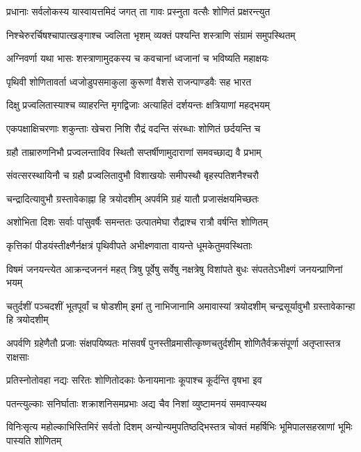 \twolineshloka
{प्रधानाः सर्वलोकस्य यास्वायत्तमिदं जगत्}
{ता गावः प्रस्नुता वत्सैः शोणितं प्रक्षरन्त्युत}


\twolineshloka
{निश्चेरुरर्चिषश्चापात्खङ्गाश्च ज्वलिता भृशम्}
{व्यक्तं पश्यन्ति शस्त्राणि संग्रामं समुपस्थितम्}


\twolineshloka
{अग्निवर्णा यथा भासः शस्त्राणामुदकस्य च}
{कवचानां ध्वजानां च भविष्यति महाक्षयः}


\twolineshloka
{पृथिवी शोणितावर्ता ध्वजोडुपसमाकुला}
{कुरूणां वैशसे राजन्पाण्डवैः सह भारत}


\twolineshloka
{दिक्षु प्रज्वलितास्याश्च व्याहरन्ति मृगद्विजाः}
{अत्याहितं दर्शयन्तः क्षत्रियाणां महद्भयम्}


\twolineshloka
{एकपक्षाक्षिचरणाः शकुन्ताः खेचरा निशि}
{रौद्रं वदन्ति संरब्धाः शोणितं छर्दयन्ति च}


\twolineshloka
{ग्रहौ ताम्रारुणनिभौ प्रज्वलन्ताविव स्थितौ}
{सप्तर्षीणामुदाराणां समवच्छाद्य वै प्रभाम्}


\twolineshloka
{संवत्सरस्थायिनौ च ग्रहौ प्रज्वलितावुभौ}
{विशाखयोः समीपस्थौ बृहस्पतिशनैश्चरौ}


\twolineshloka
{चन्द्रादित्यावुभौ ग्रस्तावेकाह्ना हि त्रयोदशीम्}
{अपर्वमि ग्रहं यातौ प्रजासंक्षयमिच्छतः}


\twolineshloka
{अशोभिता दिशः सर्वाः पांसुवर्षैः समन्ततः}
{उत्पातमेघा रौद्राश्च रात्रौ वर्षन्ति शोणितम्}


\twolineshloka
{कृत्तिकां पीडयंस्तीक्ष्णैर्नक्षत्रं पृथिवीपते}
{अभीक्ष्णवाता वायन्ते धूमकेतुमवस्थिताः}


\threelineshloka
{विषमं जनयन्त्येत आक्रन्दजननं महत्}
{त्रिषु पूर्वेषु सर्वेषु नक्षत्रेषु विशांपते}
{बुधः संपततेऽभीक्ष्णं जनयन्प्राणिनां भयम्}


\threelineshloka
{चतुर्दशीं पञ्चदशीं भूतपूर्वां च षोडशीम्}
{इमां तु नाभिजानामि अमावास्यां त्रयोदशीम्}
{चन्द्रसूर्यावुभौ ग्रस्तावेकान्हा हि त्रयोदशीम्}


\threelineshloka
{अपर्वणि ग्रहेणैतौ प्रजाः संक्षपयिष्यतः}
{मांसवर्षं पुनस्तीव्रमासीत्कृष्णचतुर्दशीम्}
{शोणितैर्वक्रसंपूर्णा अतृप्तास्तत्र राक्षसाः}


\twolineshloka
{प्रतिस्नोतोवहा नद्यः सरितः शोणितोदकाः}
{फेनायमानाः कूपाश्च कूर्दन्ति वृषभा इव}


\twolineshloka
{पतन्त्युल्काः सनिर्घाताः शक्राशनिसमप्रभाः}
{अद्य चैव निशां व्युष्टामनयं समवाप्स्यथ}


\threelineshloka
{विनिःसृत्य महोल्काभिस्तिमिरं सर्वतो दिशम्}
{अन्योन्यमुपतिष्ठद्भिस्तत्र चोक्तं महर्षिभिः}
{भूमिपालसहस्राणां भूमिः पास्यति शोणितम्}


